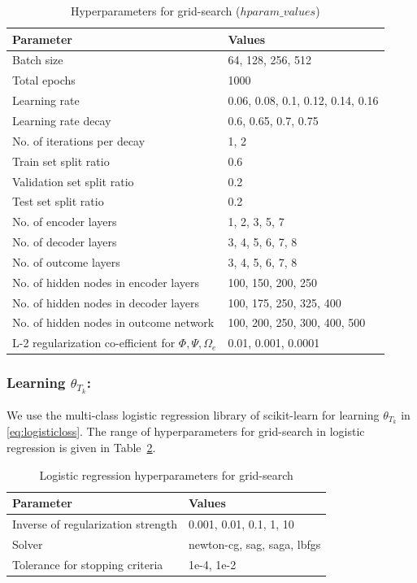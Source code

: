 \documentclass[twoside,11pt]{article}
\begin{document}
\begin{table}
  \centering
  \caption{Hyperparameters for grid-search ($hparam\_values$)}
  \label{tab:param_value_hici}
    \begin{tabular}{l|l}
    \hline
    \textbf{Parameter} & \textbf{Values}\\ \hline
    Batch size & 64, 128, 256, 512\\
    Total epochs & 1000\\
    Learning rate & 0.06, 0.08, 0.1, 0.12, 0.14, 0.16\\
    Learning rate decay & 0.6, 0.65, 0.7, 0.75\\
    No. of iterations per decay & 1, 2\\
    Train set split ratio & 0.6\\
    Validation set split ratio & 0.2\\
    Test set split ratio & 0.2\\
    No. of encoder layers  & 1, 2, 3, 5, 7\\
    No. of decoder layers  & 3, 4, 5, 6, 7, 8 \\
    No. of outcome layers  & 3, 4, 5, 6, 7, 8\\
    No. of hidden nodes in encoder layers & 100, 150, 200, 250\\
    No. of hidden nodes in decoder layers & 100, 175, 250, 325, 400\\
    No. of hidden nodes in outcome network & 100, 200, 250, 300, 400, 500\\
    L-2 regularization co-efficient for $\Phi,\Psi,\Omega_e$ & 0.01, 0.001, 0.0001\\ \hline
 \end{tabular}
\end{table}

\subsubsection{Learning $\theta_{T_{k}}$:}
We use the multi-class logistic regression library of scikit-learn for learning $\theta_{T_{k}}$ in \eqref{eq:logisticloss}. The range of hyperparameters for grid-search in logistic regression is given in Table~\ref{tab:param_value_lr}.

\begin{table}
  \centering
  \caption{Logistic regression hyperparameters for grid-search}
  \label{tab:param_value_lr}
  \begin{tabular}{l|l}
    \hline
    \textbf{Parameter} & \textbf{Values}\\ \hline
    Inverse of regularization strength & 0.001, 0.01, 0.1, 1, 10 \\
    Solver & newton-cg, sag, saga, lbfgs\\ 
    Tolerance for stopping criteria & 1e-4, 1e-2\\ \hline
\end{tabular}
\end{table}
\end{document}
